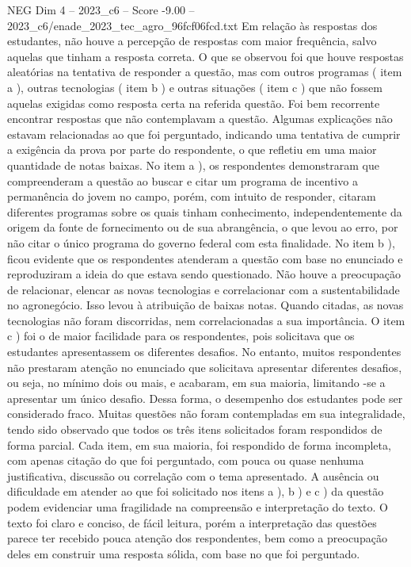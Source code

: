 \begin{textsample}{NEG Dim 4 – 2023\_c6 – Score -9.00 – 2023\_c6/enade\_2023\_tec\_agro\_96fcf06fcd.txt}
Em relação às respostas dos estudantes, não houve a percepção de respostas com maior frequência, salvo aquelas que tinham a resposta correta.
O que se observou foi que houve respostas aleatórias na tentativa de responder a questão, mas com outros programas ( item a ), outras tecnologias ( item b ) e outras situações ( item c ) que não fossem aquelas exigidas como resposta certa na referida questão.
Foi bem recorrente encontrar respostas que não contemplavam a questão.
Algumas explicações não estavam relacionadas ao que foi perguntado, indicando uma tentativa de cumprir a exigência da prova por parte do respondente, o que refletiu em uma maior quantidade de notas baixas.
No item a ), os respondentes demonstraram que compreenderam a questão ao buscar e citar um programa de incentivo a permanência do jovem no campo, porém, com intuito de responder, citaram diferentes programas sobre os quais tinham conhecimento, independentemente da origem da fonte de fornecimento ou de sua abrangência, o que levou ao erro, por não citar o único programa do governo federal com esta finalidade.
No item b ), ficou evidente que os respondentes atenderam a questão com base no enunciado e reproduziram a ideia do que estava sendo questionado.
Não houve a preocupação de relacionar, elencar as novas tecnologias e correlacionar com a sustentabilidade no agronegócio.
Isso levou à atribuição de baixas notas.
Quando citadas, as novas tecnologias não foram discorridas, nem correlacionadas a sua importância.
O item c ) foi o de maior facilidade para os respondentes, pois solicitava que os estudantes apresentassem os diferentes desafios.
No entanto, muitos respondentes não prestaram atenção no enunciado que solicitava apresentar diferentes desafios, ou seja, no mínimo dois ou mais, e acabaram, em sua maioria, limitando -se a apresentar um único desafio.
Dessa forma, o desempenho dos estudantes pode ser considerado fraco.
Muitas questões não foram contempladas em sua integralidade, tendo sido observado que todos os três itens solicitados foram respondidos de forma parcial.
Cada item, em sua maioria, foi respondido de forma incompleta, com apenas citação do que foi perguntado, com pouca ou quase nenhuma justificativa, discussão ou correlação com o tema apresentado.
A ausência ou dificuldade em atender ao que foi solicitado nos itens a ), b ) e c ) da questão podem evidenciar uma fragilidade na compreensão e interpretação do texto.
O texto foi claro e conciso, de fácil leitura, porém a interpretação das questões parece ter recebido pouca atenção dos respondentes, bem como a preocupação deles em construir uma resposta sólida, com base no que foi perguntado.

\end{textsample}
